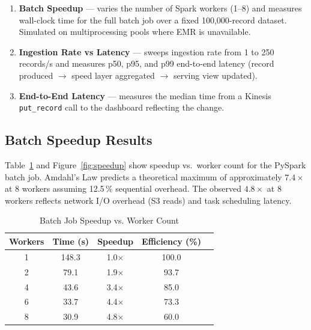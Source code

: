 \documentclass[conference]{IEEEtran}
\begin{document}
\begin{enumerate}
  \item \textbf{Batch Speedup} — varies the number of Spark workers (1--8) and
    measures wall-clock time for the full batch job over a fixed 100,000-record
    dataset. Simulated on multiprocessing pools where EMR is unavailable.
  \item \textbf{Ingestion Rate vs Latency} — sweeps ingestion rate from 1 to
    250 records/s and measures p50, p95, and p99 end-to-end latency (record
    produced $\to$ speed layer aggregated $\to$ serving view updated).
  \item \textbf{End-to-End Latency} — measures the median time from a Kinesis
    \texttt{put\_record} call to the dashboard reflecting the change.
\end{enumerate}

\subsection{Batch Speedup Results}

Table~\ref{tab:speedup} and Figure~\ref{fig:speedup} show speedup vs.\ worker
count for the PySpark batch job. Amdahl's Law predicts a theoretical maximum
of approximately $7.4\times$ at 8 workers assuming 12.5\,\% sequential overhead.
The observed $4.8\times$ at 8 workers reflects network I/O overhead (S3 reads)
and task scheduling latency.

\begin{table}[ht]
\caption{Batch Job Speedup vs. Worker Count}
\label{tab:speedup}
\centering
\scriptsize
\begin{tabular}{ccccc}
\toprule
\textbf{Workers} & \textbf{Time (s)} & \textbf{Speedup} & \textbf{Efficiency (\%)} \\
\midrule
1  & 148.3 & 1.0$\times$  & 100.0 \\
2  & 79.1  & 1.9$\times$  & 93.7  \\
4  & 43.6  & 3.4$\times$  & 85.0  \\
6  & 33.7  & 4.4$\times$  & 73.3  \\
8  & 30.9  & 4.8$\times$  & 60.0  \\
\bottomrule
\end{tabular}
\end{table}
\end{document}
